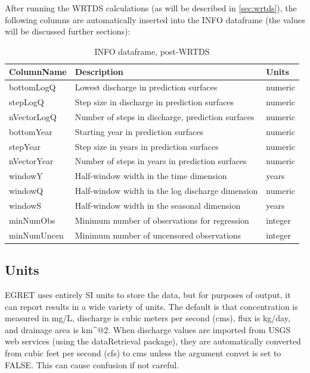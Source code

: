 \documentclass[a4paper,11pt]{article}
\begin{document}

After running the WRTDS calculations (as will be described in \ref{sec:wrtds}), the following columns are automatically inserted into the INFO dataframe (the values will be discussed further sections):

\begin{table}[!ht]
\begin{center}
\caption{INFO dataframe, post-WRTDS}
\label{table:Info2}
\begin{tabular}{lll}
  \hline
ColumnName & Description & Units \\ 
  \hline
bottomLogQ & Lowest discharge in prediction surfaces & numeric \\ 
  stepLogQ & Step size in discharge in prediction surfaces & numeric \\ 
  nVectorLogQ & Number of steps in discharge, prediction surfaces & numeric \\ 
  bottomYear & Starting year in prediction surfaces & numeric \\ 
  stepYear & Step size in years in prediction surfaces & numeric \\ 
  nVectorYear & Number of steps in years in prediction surfaces & numeric \\ 
  windowY & Half-window width in the time dimension & years \\ 
  windowQ & Half-window width in the log discharge dimension & numeric \\ 
  windowS & Half-window width in the seasonal dimension & years \\ 
  minNumObs & Minimum number of observations for regression & integer \\ 
  minNumUncen & Minimum number of uncensored observations & integer \\ 
   \hline
\end{tabular}
\end{center}
\end{table}

\FloatBarrier

\subsection{Units}
\label{sec:units}
EGRET uses entirely SI units to store the data, but for purposes of output, it can report results in a wide variety of units. The default is that concentration is measured in mg/L, discharge is cubic meters per second (cms), flux is kg/day, and drainage area is km\verb@^@2. When discharge values are imported from USGS web services (using the dataRetrieval package), they are automatically converted from cubic feet per second (cfs) to cms unless the argument convet is set to FALSE.  This can cause confusion if not careful. 
\end{document}
